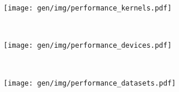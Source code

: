 \begin{subfigure}[h]{\textwidth}
\centering
\texttt{[image: gen/img/performance\_kernels.pdf]}
\vspace{-1.5em} %
\caption{}
\label{fig:performance-kernels}
\end{subfigure}
\\
\begin{subfigure}[h]{.48\textwidth}
\centering
\texttt{[image: gen/img/performance\_devices.pdf]}
\vspace{-1.5em} %
\caption{}
\label{fig:performance-devices}
\end{subfigure}
~%
\begin{subfigure}[h]{.48\textwidth}
\centering
\texttt{[image: gen/img/performance\_datasets.pdf]}
\vspace{-1.5em} %
\caption{}
\label{fig:performance-datasets}
\end{subfigure}
